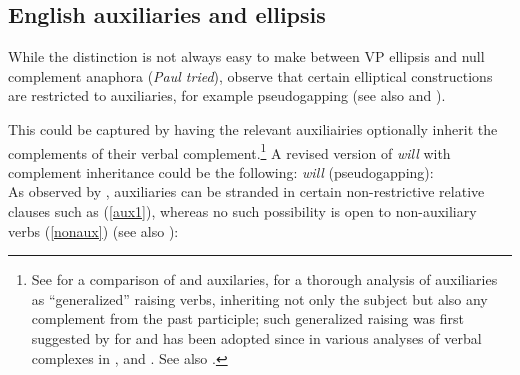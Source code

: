 \subsection{English auxiliaries and ellipsis}

While the distinction is not always easy to make between VP ellipsis and null complement anaphora
(\textit{Paul tried}), \citeauthor{Sagetal2020} observe that certain elliptical constructions are
restricted to auxiliaries, for example pseudogapping (see also
 and
\citealt{Miller2014a-u}).

\eal
{}
\zl

\noindent
This could be captured by having the relevant auxiliairies optionally inherit the complements of their verbal complement.\footnote{See  for a comparison of  and  auxilaries,  for a thorough analysis of  auxiliaries as ``generalized'' raising verbs, inheriting not only the subject but also any complement from the past participle; such generalized raising was first suggested by \citet{HN89a,HN94a} for  and has been adopted since in various analyses of verbal complexes in  \citep{Kiss95a,Meurers2000b,Kathol2001a,Mueller99a,Mueller2002b},  \citep{BvN98a} and  \citep[Section~4]{MuellerPersian}. See also .}
A revised version of \emph{will} with complement inheritance could be the following:
\ea
\emph{will} (pseudogapping):\\
\z
As observed by \citet{ArnoldandBorsley2008}, auxiliaries can be stranded in certain non-restrictive
relative clauses such as (\ref{aux1}), whereas no such possibility is open to non-auxiliary verbs
(\ref{nonaux}) (see also \crossrefchapteralt[\page \pageref{page-relative-clauses:stranded-aux}]{relative-clauses}):

